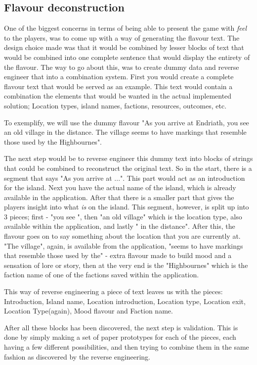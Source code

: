 \subsection{Flavour deconstruction}
One of the biggest concerns in terms of being able to present the game with \textit{feel} to the players, was to come up with a way of generating the flavour text. The design choice made was that it would be combined by lesser blocks of text that would be combined into one complete sentence that would display the entirety of the flavour. The way to go about this, was to create dummy data and reverse engineer that into a combination system. First you would create a complete flavour text that would be served as an example. This text would contain a combination the elements that would be wanted in the actual implemented solution; Location types, island names, factions, resources, outcomes, etc.

To exemplify, we will use the dummy flavour "As you arrive at Endriath, you see an old village in the distance. The village seems to have markings that resemble those used by the Highbournes".

The next step would be to reverse engineer this dummy text into blocks of strings that could be combined to reconstruct the original text. So in the start, there is a segment that says "As you arrive at ...". This part would act as an introduction for the island. Next you have the actual name of the island, which is already available in the application. After that there is a smaller part that gives the players insight into what \textit{is} on the island. This segment, however, is split up into 3 pieces; first - "you see ", then "an old village" which is the location type, also available within the application, and lastly " in the distance". After this, the flavour goes on to say something about the location that you are currently at. "The village", again, is available from the application, "seems to have markings that resemble those used by the" - extra flavour made to build mood and a sensation of lore or story, then at the very end is the "Highbournes" which is the faction name of one of the factions saved within the application.

This way of reverse engineering a piece of text leaves us with the pieces: Introduction, Island name, Location introduction, Location type, Location exit, Location Type(again), Mood flavour and Faction name.

After all these blocks has been discovered, the next step is validation. This is done by simply making a set of paper prototypes for each of the pieces, each having a few different possibilities, and then trying to combine them in the same fashion as discovered by the reverse engineering. 

